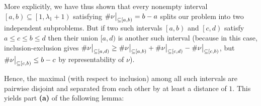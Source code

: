 \documentclass[numbers=enddot,12pt,final,onecolumn,notitlepage]{scrartcl}%
\theoremstyle{definition}
\def\seplistvar{{{\nu}}} %
\begin{document}
More explicitly, we have thus shown that every nonempty interval $\left[a,b\right) \subseteq \left[1, \lambda_1+1\right)$ satisfying $\#\nuab = b-a$ splits our problem into two independent subproblems. But if two such intervals $\left[a,b\right)$ and $\left[c,d\right)$ satisfy $a\leq c\leq b\leq d$ then their union $[a,d)$ is another such interval (because in this case, inclusion-exclusion gives $\#\nuxy{a}{d} \geq \#\nuab + \#\nuxy{c}{d} - \#\nuxy{c}{b}$, but $\#\nuxy{c}{b}\leq b-c$ by representability of $\nu$).
\begin{comment}
\footnote{\textit{Proof.} Assume that two intervals $\left[a,b\right)$ and $\left[c,d\right)$ satisfying $\#\nuab = b-a$ and $\#\nuxy{c}{d} = d-c$ intersect. We need to show that their union is another such interval.
\par We WLOG assume that $a \leq c$. Then, $c \leq b$ (since the intervals intersect). If $b > d$, then the union of the two intervals is simply $\left[a,b\right)$, which makes our claim obvious. Hence, we WLOG assume that $b \leq d$. Thus, $a \leq c \leq b \leq d$. The union of the two intervals is therefore $\left[a, d\right)$, and we must show that $\#\nuxy{a}{d} = d-a$.
A set of positive integers is a subset of both $\left[a, b\right)$ and $\left[c, d\right)$ if and only if it is a subset of $\left[c, b\right)$. On the other hand, a set of positive integers that is a subset of either $\left[a, b\right)$ or $\left[c, d\right)$ must be a subset of $\left[a, d\right)$ (but not conversely). Combining these two observations, we obtain $\#\nuxy{a}{d} \geq \#\nuab + \#\nuxy{c}{d} - \#\nuxy{c}{b}$. Since $\seplistvar$ is representable (or, when $b=c$, for obvious reasons), we have $\#\nuxy{c}{b} \leq b-c$. Thus,
\[
\#\nuxy{a}{d} \geq \underbrace{\#\nuab}_{=b-a} + \underbrace{\#\nuxy{c}{d}}_{=d-c} - \underbrace{\#\nuxy{c}{b}}_{\leq b-c} \geq \left(b-a\right) + \left(d-c\right) - \left(b-c\right) = d-a.
\]
Combined with $\#\nuxy{a}{d} \leq d-a$ (since $\seplistvar$ is representable), this yields $\#\nuxy{a}{d} = d-a$, qed.}.
\end{comment} 
Hence, the maximal (with respect to inclusion) among all such intervals are pairwise disjoint and separated from each other by at least a distance of $1$.
This yields part \textbf{(a)} of the following lemma:
\end{document}

